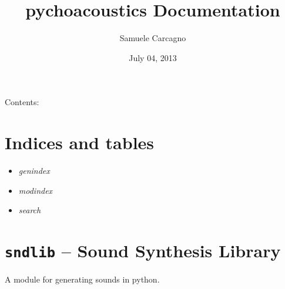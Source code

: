 \documentclass[letterpaper,10pt,english]{sphinxmanual}
\title{pychoacoustics Documentation}
\date{July 04, 2013}
\author{Samuele Carcagno}
\begin{document}
\maketitle
\tableofcontents
{}\label{index::doc}


Contents:


\chapter{Indices and tables}
\label{index:indices-and-tables}\label{index:welcome-to-pychoacoustics-s-documentation}\begin{itemize}
\item {} 
\emph{genindex}

\item {} 
\emph{modindex}

\item {} 
\emph{search}

\end{itemize}


\chapter{\texttt{sndlib} -- Sound Synthesis Library}
\label{index:module-sndlib}\label{index:sndlib-sound-synthesis-library}
A module for generating sounds in python.
\end{document}
